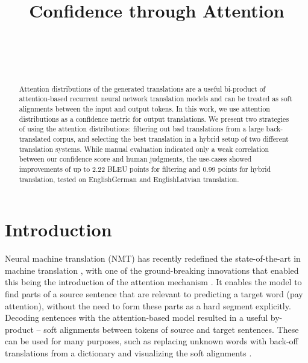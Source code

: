 \documentclass[]{article}
\begin{document}
\title{Confidence through Attention}

\author{ \hfill  {}\\ 
		\\
\AND
         \hfill {}\\ 
}

\maketitle
\pagestyle{empty}

\begin{abstract}
Attention distributions of the generated translations are a useful bi-product of attention-based recurrent neural network translation models and can be treated as soft alignments between the input and output tokens. In this work, we use attention distributions as a confidence metric for output translations. We present two strategies of using the attention distributions: filtering out bad translations from a large back-translated corpus, and selecting the best translation in a hybrid setup of two different translation systems. While manual evaluation indicated only a weak correlation between our confidence score and human judgments, the use-cases showed improvements of up to 2.22 BLEU points for filtering and 0.99 points for hybrid translation, tested on EnglishGerman and EnglishLatvian translation.
\end{abstract}

\section{Introduction}

Neural machine translation (NMT) has recently redefined the state-of-the-art in machine translation \citep{sennrich2016,wu2016google}, with one of the ground-breaking innovations that enabled this being the introduction of the attention mechanism \citep{DBLP:journals/corr/BahdanauCB14}. It enables the model to find parts of a source sentence that are relevant to predicting a target word (pay attention), without the need to form these parts as a hard segment explicitly. Decoding sentences with the attention-based model resulted in a useful by-product -- soft alignments between tokens of source and target sentences.
These can be used for many purposes, such as replacing unknown words with back-off translations from a dictionary \citep{jean-EtAl:2015:ACL-IJCNLP} and visualizing the soft alignments \citep{pbmlnmtvis}.
\end{document}
